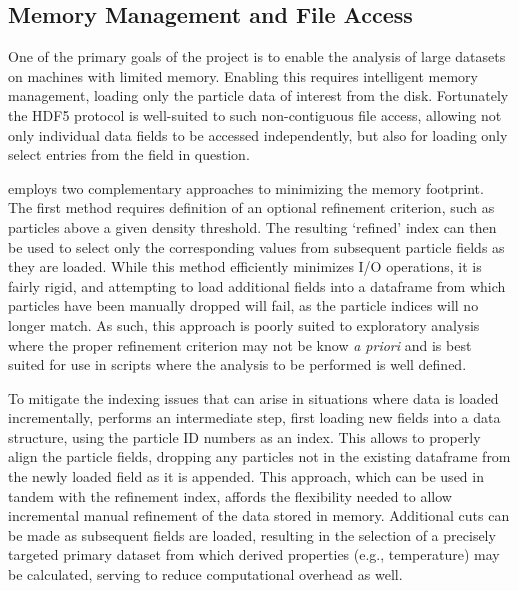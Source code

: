 \subsection{Memory Management and File Access}
\label{sec:fileIO}
One of the primary goals of the  project is to enable the analysis of large datasets on machines with limited memory.
Enabling this requires intelligent memory management, loading only the particle data of interest from the disk.
Fortunately the HDF5 protocol is well-suited to such non-contiguous file access, allowing not only individual data fields to be accessed independently, but also for  loading only select entries from the field in question.

 employs two complementary approaches to minimizing the memory footprint.
The first method requires definition of an optional refinement criterion, such as particles above a given density threshold.
The resulting `refined' index can then be used to select only the corresponding values from subsequent particle fields as they are loaded.
While this method efficiently minimizes I/O operations, it is fairly rigid, and attempting to load additional fields into a dataframe from which particles have been manually dropped will fail, as the particle indices will no longer match.  
As such, this approach is poorly suited to exploratory analysis where the proper refinement criterion may not be know {\it{a priori}} and is best suited for use in scripts where the analysis to be performed is well defined.

To mitigate the indexing issues that can arise in situations where data is loaded incrementally,  performs an intermediate step, first loading new fields into a  data structure, using the particle ID numbers as an index.  This allows  to properly align the particle fields, dropping any particles not in the existing  dataframe from the newly loaded field as it is appended.
This approach, which can be used in tandem with the refinement index, affords  the flexibility needed to allow incremental manual refinement of the data stored in memory. 
Additional cuts can be made as subsequent fields are loaded, resulting in the selection of a precisely targeted primary dataset from which derived  properties (e.g., temperature) may be calculated, serving to reduce computational overhead as well.